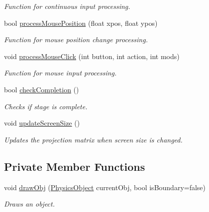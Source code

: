 \begin{DoxyCompactItemize}
\begin{DoxyCompactList}\small\item\em Function for continuous input processing. \end{DoxyCompactList}\item 
bool \hyperlink{class_stage_ad3210cb8d424925079ced7a8b4bb6398}{process\+Mouse\+Position} (float xpos, float ypos)
\begin{DoxyCompactList}\small\item\em Function for mouse position change processing. \end{DoxyCompactList}\item 
void \hyperlink{class_stage_a7b45f13e5fa53354af729d022842a4de}{process\+Mouse\+Click} (int button, int action, int mods)
\begin{DoxyCompactList}\small\item\em Function for mouse input processing. \end{DoxyCompactList}\item 
bool \hyperlink{class_stage_a6f65f2412b7f72e508ac46889dcca0b6}{check\+Completion} ()
\begin{DoxyCompactList}\small\item\em Checks if stage is complete. \end{DoxyCompactList}\item 
void \hyperlink{class_stage_a51e37b7168f0af367ae6cc7dca5949b3}{update\+Screen\+Size} ()\hypertarget{class_stage_a51e37b7168f0af367ae6cc7dca5949b3}{}\label{class_stage_a51e37b7168f0af367ae6cc7dca5949b3}

\begin{DoxyCompactList}\small\item\em Updates the projection matrix when screen size is changed. \end{DoxyCompactList}\end{DoxyCompactItemize}
\subsection*{Private Member Functions}
\begin{DoxyCompactItemize}
\item 
void \hyperlink{class_stage_a737a4dd0f7e54b3a97ddd13b88a0516e}{draw\+Obj} (\hyperlink{class_physics_object}{Physics\+Object} current\+Obj, bool is\+Boundary=false)
\begin{DoxyCompactList}\small\item\em Draws an object. \end{DoxyCompactList}\end{DoxyCompactItemize}
